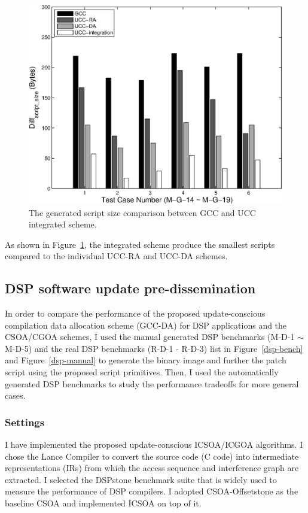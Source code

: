 \begin{figure}[htbp]
\centering
\includegraphics[scale=0.6]{./figures/inte-upd.eps}
\caption{The generated script size comparison between GCC and UCC integrated scheme.}
\label{general-inte}
\end{figure}

As shown in Figure~\ref{general-inte}, the integrated scheme produce the
smallest scripts compared to the individual UCC-RA and UCC-DA schemes. 


\subsection{DSP software update pre-dissemination}

In order to compare the performance of the proposed update-conscious compilation data
allocation scheme (GCC-DA) for DSP applications and the CSOA/CGOA schemes, I used the manual generated DSP
benchmarks (M-D-1 $\sim$ M-D-5) and the real DSP benchmarks (R-D-1 - R-D-3)
list in Figure~\ref{dsp-bench} and Figure~\ref{dsp-manual} to generate the binary image
and further the patch script using the proposed script primitives.
Then, I used the automatically generated DSP benchmarks to study the performance tradeoffs
for more general cases.

\subsubsection{Settings}
I have implemented the proposed update-conscious ICSOA/ICGOA algorithms. I chose the Lance Compiler\cite{lance} to convert the source code (C code) into intermediate representations (IRs) from which the access sequence and interference graph are extracted. I selected the DSPstone\cite{dspstone} benchmark suite that is widely used to measure the performance of DSP compilers. I adopted CSOA-Offsetstone\cite{offsetstone} as the baseline CSOA and implemented ICSOA on top of it. 
%


